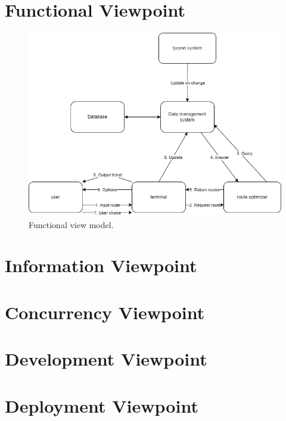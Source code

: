 \section{Functional Viewpoint}
\begin{figure}[h!]
    \centering
    \includegraphics[width=\textwidth]{drawings/views_draft1/functional_view_draft1.png}
    \caption{Functional view model.}
    \label{fig:functional_view_model}
\end{figure}

\section*{Information Viewpoint}

\section*{Concurrency Viewpoint}

\section*{Development Viewpoint}

\section*{Deployment Viewpoint}